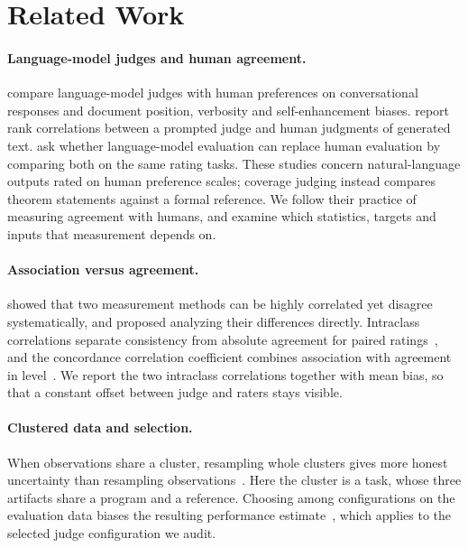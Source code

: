\section{Related Work}
\label{sec:related}

\paragraph{Language-model judges and human agreement.}
\citet{zheng2023judging} compare language-model judges with human preferences on conversational responses and document position, verbosity and self-enhancement biases.
\citet{liu2023geval} report rank correlations between a prompted judge and human judgments of generated text.
\citet{chiang2023can} ask whether language-model evaluation can replace human evaluation by comparing both on the same rating tasks.
These studies concern natural-language outputs rated on human preference scales; coverage judging instead compares theorem statements against a formal reference.
We follow their practice of measuring agreement with humans, and examine which statistics, targets and inputs that measurement depends on.

\paragraph{Association versus agreement.}
\citet{bland1986statistical} showed that two measurement methods can be highly correlated yet disagree systematically, and proposed analyzing their differences directly.
Intraclass correlations separate consistency from absolute agreement for paired ratings~\citep{shrout1979intraclass,mcgraw1996forming}, and the concordance correlation coefficient combines association with agreement in level~\citep{lin1989concordance}.
We report the two intraclass correlations together with mean bias, so that a constant offset between judge and raters stays visible.

\paragraph{Clustered data and selection.}
When observations share a cluster, resampling whole clusters gives more honest uncertainty than resampling observations~\citep{field2007bootstrapping}.
Here the cluster is a task, whose three artifacts share a program and a reference.
Choosing among configurations on the evaluation data biases the resulting performance estimate~\citep{cawley2010overfitting}, which applies to the selected judge configuration we audit.

